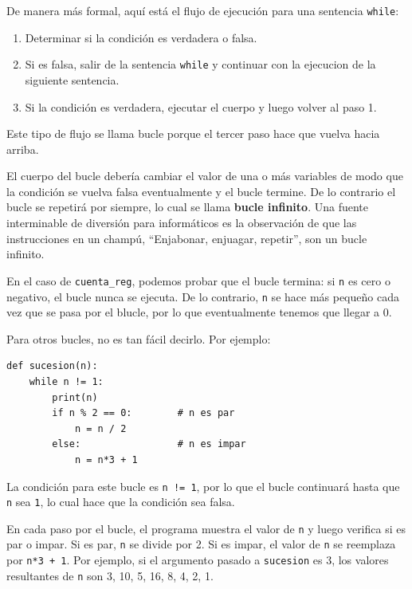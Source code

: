 \documentclass[10pt]{book}
\begin{document}
De manera más formal, aquí está el flujo de ejecución para una sentencia {\tt while}:

\begin{enumerate}

\item Determinar si la condición es verdadera o falsa.

\item Si es falsa, salir de la sentencia {\tt while}
y continuar con la ejecucion de la siguiente sentencia.

\item Si la condición es verdadera, ejecutar el
cuerpo y luego volver al paso 1.

\end{enumerate}

Este tipo de flujo se llama bucle porque el tercer paso
hace que vuelva hacia arriba.

El cuerpo del bucle debería cambiar el valor de una o más variables
de modo que la condición se vuelva falsa eventualmente y el bucle
termine.  De lo contrario el bucle se repetirá por siempre, lo cual se llama
{\bf bucle infinito}.  Una fuente interminable de diversión para
informáticos es la observación de que las instrucciones en un champú,
``Enjabonar, enjuagar, repetir'', son un bucle infinito.

En el caso de {\tt cuenta\_reg}, podemos probar que el bucle
termina: si {\tt n} es cero o negativo, el bucle nunca se ejecuta.
De lo contrario, {\tt n} se hace más pequeño cada vez que se pasa por
el blucle, por lo que eventualmente tenemos que llegar a 0.

Para otros bucles, no es tan fácil decirlo.  Por ejemplo:

\begin{verbatim}
def sucesion(n):
    while n != 1:
        print(n)
        if n % 2 == 0:        # n es par
            n = n / 2
        else:                 # n es impar
            n = n*3 + 1
\end{verbatim}
%
La condición para este bucle es {\tt n != 1}, por lo que el bucle continuará
hasta que {\tt n} sea {\tt 1}, lo cual hace que la condición sea falsa.

En cada paso por el bucle, el programa muestra el valor de {\tt n}
y luego verifica si es par o impar.  Si es par, {\tt n} se
divide por 2.  Si es impar, el valor de {\tt n} se reemplaza por
{\tt n*3 + 1}. Por ejemplo, si el argumento pasado a {\tt sucesion}
es 3, los valores resultantes de {\tt n} son 3, 10, 5, 16, 8, 4, 2, 1.
\end{document}
